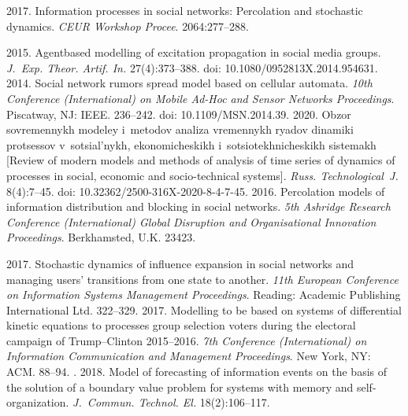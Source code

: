 \begin{multicols}{2}
{{\begin{thebibliography}{99}
 2017. Information processes in social networks: 
Percolation and stochastic dynamics. \textit{CEUR Workshop Procee}. 2064:277--288. 

 2015. Agentbased modelling of excitation propagation in social media 
groups. \textit{J.~Exp. Theor. Artif. In.} 27(4):373--388. doi: 10.1080/0952813X.2014.954631.
 2014. Social network rumors spread model based on cellular automata. 
\textit{10th Conference (International)  on Mobile Ad-Hoc and Sensor Networks Proceedings}. 
Piscatway, NJ: IEEE. 236--242. 
doi: 10.1109/MSN.2014.39.
 2020. 
Obzor sovremennykh modeley i~metodov analiza vremennykh ryadov dinamiki protsessov 
v~sotsial'nykh, ekonomicheskikh i~sotsiotekhnicheskikh sistemakh
[Review of 
modern models and methods of analysis of time series of dynamics of processes in social, economic and socio-technical 
systems]. \textit{Russ. Technological~J.} 8(4):7--45. doi: 
10.32362/2500-316X-2020-8-4-7-45.
 2016. 
Percolation models of information distribution and 
blocking in social networks. \textit{5th Ashridge  Research Conference (International)  Global Disruption and 
Organisational Innovation Proceedings}. Berkhamsted, U.K. 23423. 

 2017. Stochastic dynamics of influence expansion in social 
networks and managing users' transitions from one state to another. \textit{11th European Conference on Information 
Systems Management Proceedings}. Reading: Academic Publishing International Ltd. 322--329. 
 2017. Modelling to be based on systems of 
differential kinetic equations to processes group selection voters during the electoral campaign
 of Trump--Clinton 2015--2016. \textit{7th  Conference (International) on Information Communication and Management Proceedings}. 
New York, NY: ACM.  88--94.
. 2018. Model of forecasting of 
information events on the basis of the solution of a boundary value problem for systems with memory and  
self-organization. \textit{J.~Commun. Technol. El.} 18(2):106--117.



\end{thebibliography}}}
\end{multicols}
